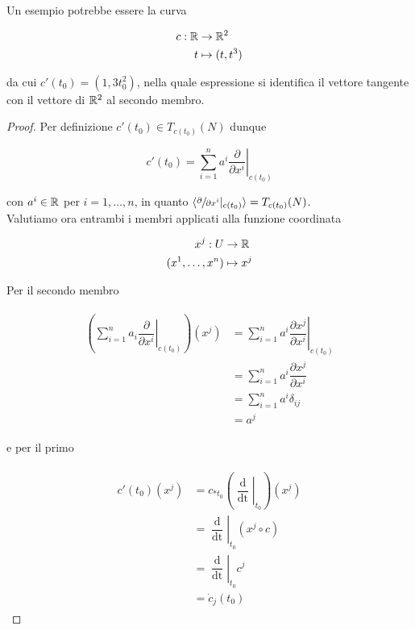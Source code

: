 Un esempio potrebbe essere la curva

\begin{align}
	\begin{split}
		c : \mathbb{R} &\to \mathbb{R}^{2}\\
		t &\mapsto (t,t^{3})
	\end{split}
\end{align}

da cui $ c'(t_{0}) = (1, 3 t_{0}^{2}) $, nella quale espressione si identifica il vettore tangente con il vettore di $ \mathbb{R}^{2} $ al secondo membro.

\begin{proof}
	Per definizione $ c'(t_{0}) \in T_{c(t_{0})}(N) $ dunque
	
	\begin{equation}
		c'(t_{0}) = \sum_{i=1}^{n} a^{i} \left. \dfrac{\partial}{\partial x^{i}} \right|_{c(t_{0})}
	\end{equation}

	con $ a^{i} \in \mathbb{R} $ per $ i=1,\dots,n $, in quanto $ \langle \sfrac{\partial}{\partial x^{i}} |_{c(t_{0})} \rangle = T_{c(t_{0})}(N) $.\\
	Valutiamo ora entrambi i membri applicati alla funzione coordinata
	
	\begin{align}
		\begin{split}
			x^{j} : U &\to \mathbb{R}\\
			(x^{1},\dots,x^{n}) &\mapsto x^{j}
		\end{split}
	\end{align}

	Per il secondo membro
	
	\begin{align}
		\begin{split}
			\left( \sum_{i=1}^{n} a_{i} \left. \dfrac{\partial}{\partial x^{i}} \right|_{c(t_{0})} \right) (x^{j}) &= \sum_{i=1}^{n} a^{i} \left. \dfrac{\partial x^{j}}{\partial x^{i}} \right|_{c(t_{0})}\\
			&= \sum_{i=1}^{n} a^{i} \dfrac{\partial x^{j}}{\partial x^{i}}\\
			&= \sum_{i=1}^{n} a^{i} \delta_{ij}\\
			&= a^{j}
		\end{split}
	\end{align}

	e per il primo
	
	\begin{align}
		\begin{split}
			c'(t_{0})(x^{j}) &= c_{*t_{0}} \left( \left. \dfrac{\operatorname{d}}{\operatorname{dt}} \right|_{t_{0}} \right)(x^{j})\\
			&= \left. \dfrac{\operatorname{d}}{\operatorname{dt}} \right|_{t_{0}} (x^{j} \circ c)\\
			&= \left. \dfrac{\operatorname{d}}{\operatorname{dt}} \right|_{t_{0}} c^{j}\\
			&= \dot{c}_{j}(t_{0})
		\end{split}
	\end{align}
\end{proof}

